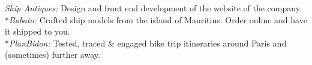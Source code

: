 \documentclass[11pt,a4paper,sans]{moderncv}
\begin{document}
{{\textit{Ship Antiques:} Design and front end development of the website of the company. \href{https://shipantiques.herokuapp.com/}   {} }
\\*{\textit{Bobato:}  Crafted ship models from the island of Mauritius. Order online and have it shipped to you. \href{https://bobato-prk.herokuapp.com/}   {} }
\\*{\textit{PlanBidon:}  Tested, traced \& engaged bike trip itineraries around Paris and (sometimes) further away. \href{https://planbidon.herokuapp.com/}   {} }}
\end{document}
